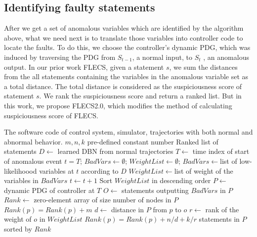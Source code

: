 \subsection{Identifying faulty statements}
After we get a set of anomalous variables which are identified by the algorithm above, what we need next is to translate those variables into controller code to locate the faults. To do this, we choose the controller’s dynamic PDG, which was induced by traversing the PDG from $S_{t-1}$, a normal input, to $S_t$ , an anomalous output. In our prior work FLECS, given a statement $s$, we sum the distances from the all statements containing the variables in the anomalous variable set as a total distance. The total distance is considered as the suspiciousness score of statement $s$. We rank the suspiciousness score and return a ranked list. But in this work, we propose FLECS2.0, which modifies the method of calculating suspiciousness score of FLECS. 

\renewcommand{\algorithmicrequire}{\textbf{Input:}}
\renewcommand{\algorithmicensure}{\textbf{Output:}}
\begin{algorithm}
  \label{flecs2.0}
  \begin{algorithmic}[1]
    \Require The software code of control system, simulator, trajectories with both normal and abnormal behavior.
    \Statex $m, n, k$ pre-defined constant number
    \Ensure Ranked list of statements
    \State $D\leftarrow$ learned DBN from normal trajectories
    \State $T\leftarrow$ time index of start of anomalous event
    \State $t=T$; $BadVars\leftarrow \emptyset$; $WeightList\leftarrow \emptyset$; 
    	\State $BadVars\leftarrow$list of low-likelihoood variables at $t$ according to $D$
	\State $WeightList\leftarrow$list of weight of the variables in $BadVars$
	\State $t \leftarrow t+1$
    \EndWhile
    \State Sort $WeightList$ in descending order
    \State $P\leftarrow$ dynamic PDG of controller at $T$
    \State $O\leftarrow$ statements outputting $BadVars$ in $P$
    \State $Rank\leftarrow$ zero-element array of size number of nodes in $P$  
            		\State $Rank(p)=Rank(p)+m$
			\State $d \leftarrow$ distance in $P$ from $p$ to $o$
			\State $r \leftarrow$ rank of the weight of $o$ in $WeightList$
            		\State $Rank(p)=Rank(p)+n/d+k/r$
        		\EndIf
   	    \EndFor
    \EndFor
    \Return statements in $P$ sorted by $Rank$
  \end{algorithmic}
\end{algorithm}


